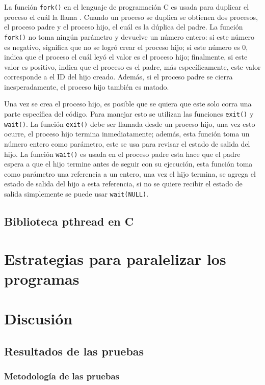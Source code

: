 \documentclass{report}
\begin{document}
La función \texttt{fork()} en el lenguaje de programación C es usada para duplicar el proceso el cuál la llama \cite{ref5}.
Cuando un proceso se duplica se obtienen dos procesos, el proceso padre y el proceso hijo, el cuál es la dúplica del padre.
La función \texttt{fork()} no toma ningún parámetro y devuelve un número entero: si este número es negativo, significa que no se logró crear el proceso hijo; si este número es 0, indica que el proceso el cuál leyó el valor es el proceso hijo; finalmente, si este valor es positivo, indica que el proceso es el padre, más específicamente, este valor corresponde a el ID del hijo creado. 
Además, si el proceso padre se cierra inesperadamente, el proceso hijo también es matado.

Una vez se crea el proceso hijo, es posible que se quiera que este solo corra una parte específica del código.
Para manejar esto se utilizan las funciones \texttt{exit()} y \texttt{wait()}.
La función \texttt{exit()} debe ser llamada desde un proceso hijo, una vez esto ocurre, el proceso hijo termina inmediatamente; además, esta función toma un número entero como parámetro, este se usa para revisar el estado de salida del hijo.
La función \texttt{wait()} es usada en el proceso padre esta hace que el padre espera a que el hijo termine antes de seguir con su ejecución, esta función toma como parámetro una referencia a un entero, una vez el hijo termina, se agrega el estado de salida del hijo a esta referencia, si no se quiere recibir el estado de salida simplemente se puede usar \texttt{wait(NULL)}.

\subsection {Biblioteca pthread en C}


\section {Estrategias para paralelizar los programas}

\section{Discusión}
\subsection{Resultados de las pruebas}
\subsubsection{Metodología de las pruebas}
\end{document}
